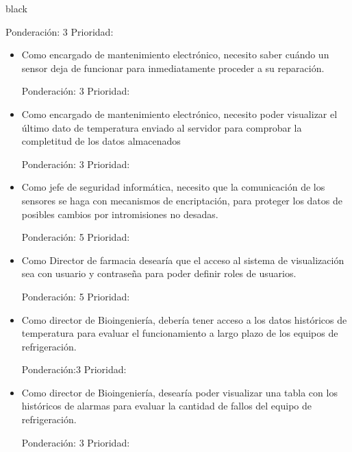 \documentclass[11pt]{charter}
\begin{document}
\begin{consigna}{black}
\begin{itemize}
Ponderación: 3 Prioridad:
\end{itemize}


\begin{itemize}
\item Como encargado de mantenimiento electrónico, necesito saber cuándo un sensor deja de funcionar para inmediatamente proceder a su reparación. 

Ponderación: 3 Prioridad:
\end{itemize}

\begin{itemize}
\item Como encargado de mantenimiento electrónico, necesito poder visualizar el último dato de temperatura enviado al servidor para comprobar la completitud de los datos almacenados

Ponderación: 3 Prioridad:
\end{itemize}


\begin{itemize}
\item Como jefe de seguridad informática, necesito que la comunicación de los sensores se haga con mecanismos de encriptación, para proteger los datos de posibles cambios por intromisiones no desadas. 

Ponderación: 5 Prioridad:
\end{itemize}


\begin{itemize}
\item Como Director de farmacia desearía que el acceso al sistema de visualización sea con usuario y contraseña para poder definir roles de usuarios. 

Ponderación: 5 Prioridad:
\end{itemize}


\begin{itemize}
\item Como director de Bioingeniería, debería tener acceso a los datos históricos de temperatura para evaluar el funcionamiento a largo plazo de los equipos de refrigeración. 

Ponderación:3 Prioridad:
\end{itemize}

\begin{itemize}
\item Como director de Bioingeniería, desearía poder visualizar una tabla con los históricos de alarmas para evaluar la cantidad de fallos del equipo de refrigeración. 

Ponderación: 3 Prioridad:
\end{itemize}



\end{consigna}
\end{document}
